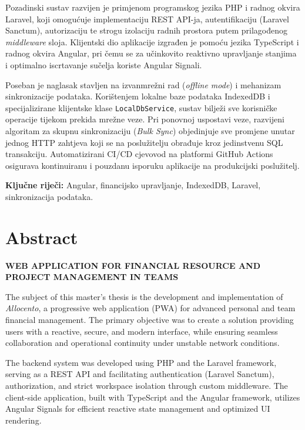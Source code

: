 \documentclass[a4paper,12pt,oneside]{article}
\begin{document}
	Pozadinski sustav razvijen je primjenom programskog jezika PHP i radnog okvira Laravel, koji omogućuje implementaciju REST API-ja, autentifikaciju (Laravel Sanctum), autorizaciju te strogu izolaciju radnih prostora putem prilagođenog \textit{middleware} sloja. Klijentski dio aplikacije izgrađen je pomoću jezika TypeScript i radnog okvira Angular, pri čemu se za učinkovito reaktivno upravljanje stanjima i optimalno iscrtavanje sučelja koriste Angular Signali.
	
	Poseban je naglasak stavljen na izvanmrežni rad (\textit{offline mode}) i mehanizam sinkronizacije podataka. Korištenjem lokalne baze podataka IndexedDB i specijalizirane klijentske klase \texttt{LocalDbService}, sustav bilježi sve korisničke operacije tijekom prekida mrežne veze. Pri ponovnoj uspostavi veze, razvijeni algoritam za skupnu sinkronizaciju (\textit{Bulk Sync}) objedinjuje sve promjene unutar jednog HTTP zahtjeva koji se na poslužitelju obrađuje kroz jedinstvenu SQL transakciju. Automatizirani CI/CD cjevovod na platformi GitHub Actions osigurava kontinuiranu i pouzdanu isporuku aplikacije na produkcijski poslužitelj.
	
	\bigskip
	\noindent\textbf{Ključne riječi:} Angular, financijsko upravljanje, IndexedDB, Laravel, sinkronizacija podataka.
	
	\newpage
	\section*{Abstract}
	
	
	\textbf{\large WEB APPLICATION FOR FINANCIAL RESOURCE AND PROJECT MANAGEMENT IN TEAMS}
	
	\vspace{0.5cm}
	
	The subject of this master's thesis is the development and implementation of \textit{Allocento}, a progressive web application (PWA) for advanced personal and team financial management. The primary objective was to create a solution providing users with a reactive, secure, and modern interface, while ensuring seamless collaboration and operational continuity under unstable network conditions.
	
	The backend system was developed using PHP and the Laravel framework, serving as a REST API and facilitating authentication (Laravel Sanctum), authorization, and strict workspace isolation through custom middleware. The client-side application, built with TypeScript and the Angular framework, utilizes Angular Signals for efficient reactive state management and optimized UI rendering.
	
\end{document}
